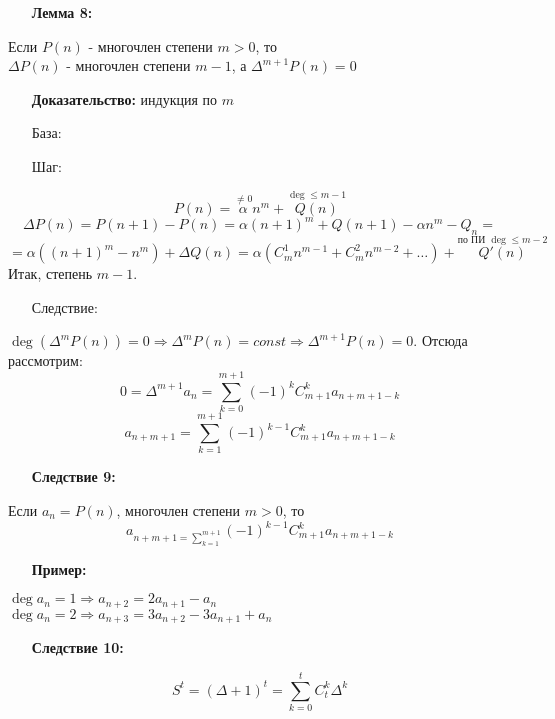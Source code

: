 \documentclass[12pt, letterpaper, twoside]{article}
\newcommand{\AutoBr}[1]{\left(#1\right)}
\begin{document}
\newpage
\begin{enumerate}
    \item[\textbf{Лемма 8:}]
\end{enumerate}
Если $P(n)$ - многочлен степени $m > 0$, то\\
$\Delta P(n)$ - многочлен степени $m - 1$, а $\Delta^{m + 1}P(n) = 0$
\begin{enumerate}
    \item[\textbf{Доказательство:}] индукция по $m$
\end{enumerate}
\begin{enumerate}
    \item[База:]
\end{enumerate}
\begin{enumerate}
    \item[Шаг:]
\end{enumerate}
\[P(n) = \overset{\neq 0}{\alpha} n^m + \overset{\deg \leq m - 1}{Q(n)}\]
\[\Delta P(n) = P(n + 1) - P(n) = \alpha(n + 1)^m + Q(n + 1) - \alpha n^m - Q_n =\]
\[= \alpha \AutoBr{(n + 1)^m - n^m} + \Delta Q(n) = \alpha(C_m^1 n^{m - 1} + C_m^2 n^{m - 2}+\dots)+ \overset{\text{по ПИ } \deg\leq m - 2}{Q'(n)}\]
Итак, степень $m - 1$.
\begin{enumerate}
    \item[Следствие:]
\end{enumerate}
$\deg(\Delta^m P(n)) = 0\Rightarrow \Delta^m P(n) = const\Rightarrow \Delta^{m + 1} P(n) = 0$. Отсюда рассмотрим:
\[0 = \Delta^{m + 1}a_n = \sum_{k = 0}^{m + 1}(-1)^k C_{m + 1}^k a_{n + m + 1 - k}\]
\[a_{n + m + 1} = \sum_{k = 1}^{m + 1}(-1)^{k - 1} C_{m + 1}^k a_{n + m + 1 - k}\]
\begin{enumerate}
    \item[\textbf{Следствие 9:}]
\end{enumerate}
Если $a_n = P(n)$, многочлен степени $m > 0$, то
\[a_{n + m + 1 = \sum_{k = 1}^{m + 1}} (-1)^{k - 1} C_{m + 1}^{k} a_{n + m + 1 - k}\]
\begin{enumerate}
    \item[\textbf{Пример:}]
\end{enumerate}
$\deg a_n = 1\Rightarrow a_{n + 2} = 2a_{n + 1} - a_n$\\
$\deg a_n = 2\Rightarrow a_{n + 3} = 3a_{n + 2} - 3a_{n + 1} + a_n$
\begin{enumerate}
    \item[\textbf{Следствие 10:}]
\end{enumerate}
\[S^t = (\Delta + 1)^t = \sum_{k = 0}^{t} C_t^k\Delta^k\]\newpage
\end{document}
